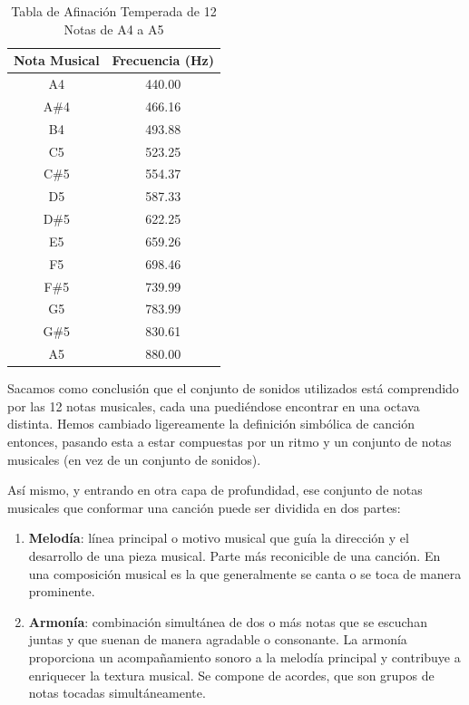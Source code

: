 \begin{table}[h]
    \centering
    \begin{tabular}{c|c}
        \textbf{Nota Musical} & \textbf{Frecuencia (Hz)} \\
        \hline
        A4 & 440.00 \\
        A\#4 & 466.16 \\
        B4 & 493.88 \\
        C5 & 523.25 \\
        C\#5 & 554.37 \\
        D5 & 587.33 \\
        D\#5 & 622.25 \\
        E5 & 659.26 \\
        F5 & 698.46 \\
        F\#5 & 739.99 \\
        G5 & 783.99 \\
        G\#5 & 830.61 \\
        A5 & 880.00 \\
    \end{tabular}
    \caption{Tabla de Afinación Temperada de 12 Notas de A4 a A5}
    \label{tab:temperedTuningTable_A4_A5}
\end{table}

        Sacamos como conclusión que el conjunto de sonidos utilizados está comprendido por las 12 notas musicales, cada una puediéndose encontrar en una octava distinta. Hemos cambiado ligereamente la definición simbólica de canción entonces, pasando esta a estar compuestas por un ritmo y un conjunto de notas musicales (en vez de un conjunto de sonidos).  

        Así mismo, y entrando en otra capa de profundidad, ese conjunto de notas musicales que conformar una canción puede ser dividida en dos partes:

        \begin{enumerate}
            \item[\textbullet] \textbf{Melodía}: línea principal o motivo musical que guía la dirección y el desarrollo de una pieza musical. Parte más reconicible de una canción. En una composición musical es la que generalmente se canta o se toca de manera prominente.
            \item[\textbullet] \textbf{Armonía}: combinación simultánea de dos o más notas que se escuchan juntas y que suenan de manera agradable o consonante. La armonía proporciona un acompañamiento sonoro a la melodía principal y contribuye a enriquecer la textura musical. Se compone de acordes, que son grupos de notas tocadas simultáneamente.

        \end{enumerate}

